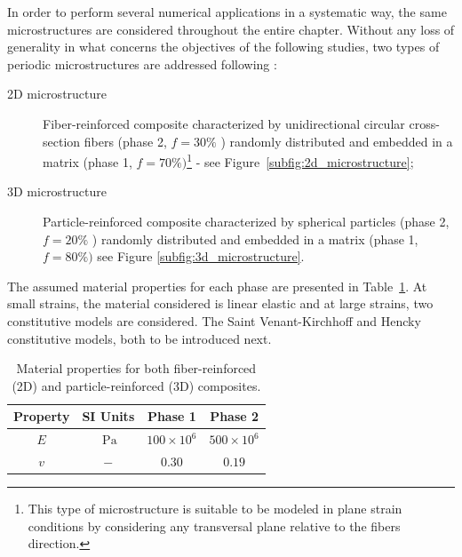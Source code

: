 In order to perform several numerical applications in a systematic way, the same microstructures are considered throughout the entire chapter.
Without any loss of generality in what concerns the objectives of the following studies, two types of periodic microstructures are addressed following \cite{ferreira_accurate_2020}:

\begin{description}
  \item[2D microstructure] Fiber-reinforced composite characterized by unidirectional circular cross-section fibers (phase 2, \(f=30 \%\) ) randomly distributed and embedded in a matrix (phase 1, \(f=70 \%)\)\footnote{This type of microstructure is suitable to be modeled in plane strain conditions by considering any transversal plane
relative to the fibers direction.} - see Figure~\ref{subfig:2d_microstructure};

  \item[3D microstructure] Particle-reinforced composite characterized by spherical particles (phase 2, \(f=20 \%\) ) randomly distributed and embedded in a matrix (phase 1, \(f=80 \%)\) see Figure \ref{subfig:3d_microstructure}.
\end{description}

The assumed material properties for each phase are presented in Table~\ref{tab:mat_properties}.
At small strains, the material considered is linear elastic and at large strains, two constitutive models are considered.
The Saint Venant-Kirchhoff and Hencky constitutive models, both to be introduced next.

\begin{table}[htbp]
\caption{Material properties for both fiber-reinforced (2D) and particle-reinforced (3D) composites.}
\label{tab:mat_properties}
\centering
\begin{tabular}{cccc}
\vphantom{\Big |}Property & SI Units & Phase 1 & Phase 2 \\
\hline\hline \vphantom{\Big |}\(E\) & \(\mathrm{~Pa}\) & \(100 \times 10^{6}\) & \(500 \times 10^{6}\) \\
\(v\) & \(-\) & \(0.30\) & \(0.19\) \\
\hline\hline
\end{tabular}
\end{table}

